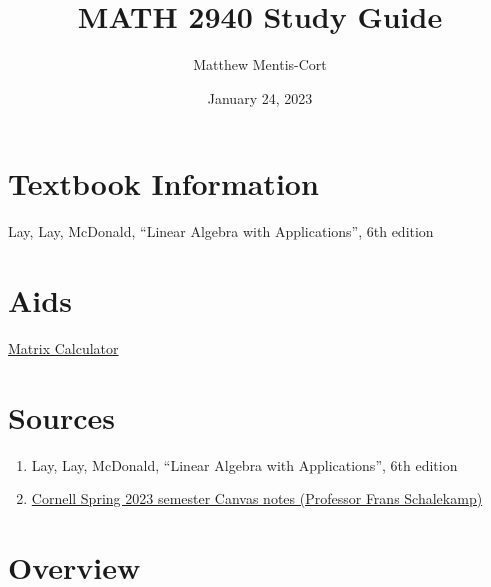 \documentclass[a4paper,12pt]{article}
\title{MATH 2940 Study Guide}
\author{Matthew Mentis-Cort}
\date{January 24, 2023}
\theoremstyle{definition}
\theoremstyle{definition}
\begin{document}
	\maketitle
	
	\tableofcontents
	\newpage
	
	\section{Textbook Information}
	Lay, Lay, McDonald, “Linear Algebra with Applications”, 6th edition
	\section{Aids}
	\href{https://matrixcalc.org/}{Matrix Calculator}
	
	\section{Sources}
	\begin{enumerate}
		\item Lay, Lay, McDonald, “Linear Algebra with Applications”, 6th edition
		
		\item \href{https://canvas.cornell.edu/courses/48198}{Cornell Spring 2023 semester Canvas notes (Professor Frans Schalekamp)}
	\end{enumerate}
	\newpage
	
	\section{Overview}
\end{document}
